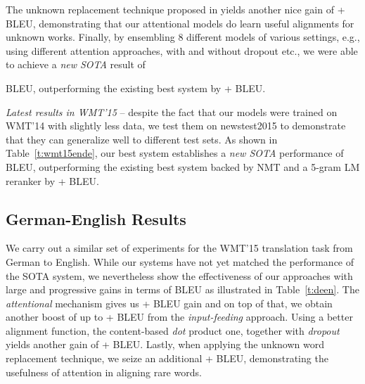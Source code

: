 \documentclass[11pt,a4paper]{article}
\begin{document}
The unknown replacement technique proposed in \cite{luong15,jean15} yields another nice
gain of + BLEU, demonstrating that our attentional models
do learn useful alignments for unknown works. Finally, by ensembling 8 different
models of various settings, e.g., using different attention approaches, with
and without dropout etc., we were able to achieve a {\it new SOTA} result of

BLEU, outperforming the existing best system \cite{jean15} by + BLEU.

\begin{table}[tbh!]
\centering
{}
\caption{{\bf WMT'15 English-German results} -- {\it NIST} BLEU scores of the
winning entry in WMT'15 and our best one on newstest2015.}
\label{t:wmt15ende}
\end{table}

{\it Latest results in WMT'15} -- despite the fact that our models were trained
on WMT'14 with slightly less data, we test them on newstest2015 to demonstrate
that they can generalize well to different test sets. As shown in Table~\ref{t:wmt15ende}, our best
system establishes a {\it new SOTA} performance of  BLEU,
outperforming the existing best system backed by NMT and a 5-gram LM reranker
by +
BLEU.

\subsection{German-English Results}
We carry out a similar set of experiments for the WMT'15 translation task from German
to English. 
While our systems have not yet matched the performance of the 
SOTA system, we nevertheless show the effectiveness of our
approaches with large and progressive gains in terms of BLEU as illustrated in
Table~\ref{t:deen}. 
The {\it attentional} mechanism gives us + BLEU gain and on top of that, we
obtain another boost of up to + BLEU from the {\it input-feeding} approach.
Using a better alignment function, the content-based {\it dot} product one,
together with {\it dropout} yields another gain of + BLEU. Lastly, when
applying the unknown word replacement technique, we seize an additional +
BLEU, demonstrating the usefulness of attention in aligning rare words.
 
\end{document}
